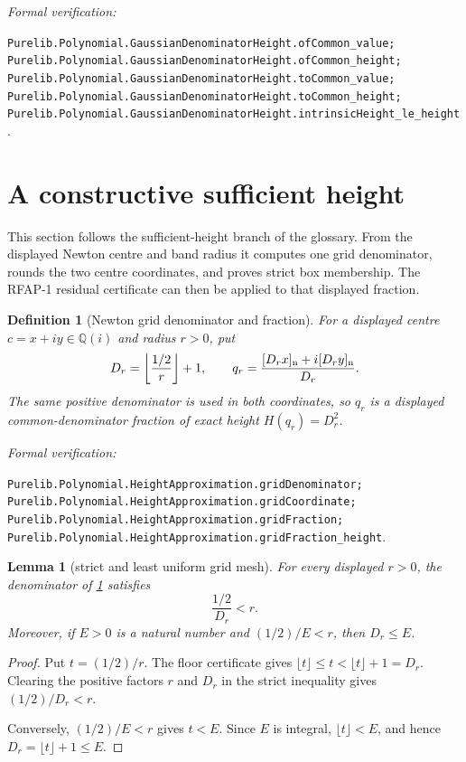 \documentclass[11pt]{article}
\newtheorem{lemma}[lemma]{Lemma}
\newtheorem{definition}[definition]{Definition}
\newcommand{\Qi}{\mathbb{Q}(i)}
\newcommand{\leanref}[1]{\par\smallskip\noindent
  \emph{Formal verification:}\par\nobreak
  {\raggedright\nolinkurl{#1}.\par}}
\begin{document}
\leanref{Purelib.Polynomial.GaussianDenominatorHeight.ofCommon_value;
Purelib.Polynomial.GaussianDenominatorHeight.ofCommon_height;
Purelib.Polynomial.GaussianDenominatorHeight.toCommon_value;
Purelib.Polynomial.GaussianDenominatorHeight.toCommon_height;
Purelib.Polynomial.GaussianDenominatorHeight.intrinsicHeight_le_height}

\section{A constructive sufficient height}
\label{sec:upper}

This section follows the sufficient-height branch of the glossary.  From the
displayed Newton centre and band radius it computes one grid denominator,
rounds the two centre coordinates, and proves strict box membership.  The
RFAP-1 residual certificate can then be applied to that displayed fraction.

\begin{definition}[Newton grid denominator and fraction]
\label{def:newton-grid}
For a displayed centre $c=x+iy\in\Qi$ and radius $r>0$, put
\[
 D_r=\left\lfloor\frac{1/2}{r}\right\rfloor+1,
 \qquad
 q_r=\frac{[D_rx]_{\rm n}+i[D_ry]_{\rm n}}{D_r}.
\]
The same positive denominator is used in both coordinates, so $q_r$ is a
displayed common-denominator fraction of exact height $H(q_r)=D_r^2$.
\end{definition}

\leanref{Purelib.Polynomial.HeightApproximation.gridDenominator;
Purelib.Polynomial.HeightApproximation.gridCoordinate;
Purelib.Polynomial.HeightApproximation.gridFraction;
Purelib.Polynomial.HeightApproximation.gridFraction_height}

\begin{lemma}[strict and least uniform grid mesh]
\label{lem:grid-mesh}
For every displayed $r>0$, the denominator of
\cref{def:newton-grid} satisfies
\[
                         \frac{1/2}{D_r}<r.
\]
Moreover, if $E>0$ is a natural number and $(1/2)/E<r$, then $D_r\le E$.
\end{lemma}

\begin{proof}
Put $t=(1/2)/r$.  The floor certificate gives
$\lfloor t\rfloor\le t<\lfloor t\rfloor+1=D_r$.  Clearing the positive
factors $r$ and $D_r$ in the strict inequality gives $(1/2)/D_r<r$.

Conversely, $(1/2)/E<r$ gives $t<E$.  Since $E$ is integral,
$\lfloor t\rfloor<E$, and hence $D_r=\lfloor t\rfloor+1\le E$.
\end{proof}
\end{document}
